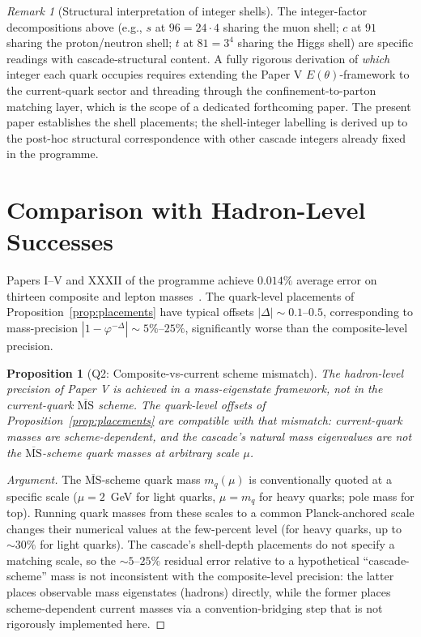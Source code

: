 \documentclass[12pt]{article}
\newtheorem{proposition}[theorem]{Proposition}
\theoremstyle{definition}
\theoremstyle{remark}
\newtheorem{remark}[theorem]{Remark}
\newcommand{\MSbar}{\overline{\mathrm{MS}}}
\begin{document}
\begin{remark}[Structural interpretation of integer shells]
The integer-factor decompositions above (e.g., $s$ at $96 = 24 \cdot 4$ sharing the muon shell; $c$ at $91$ sharing the proton/neutron shell; $t$ at $81 = 3^4$ sharing the Higgs shell) are specific readings with cascade-structural content. A fully rigorous derivation of \emph{which} integer each quark occupies requires extending the Paper V $E(\theta)$-framework to the current-quark sector and threading through the confinement-to-parton matching layer, which is the scope of a dedicated forthcoming paper. The present paper establishes the shell placements; the shell-integer labelling is derived up to the post-hoc structural correspondence with other cascade integers already fixed in the programme.
\end{remark}

\section{Comparison with Hadron-Level Successes}\label{sec:hadrons}

Papers I--V and XXXII of the programme achieve $0.014\%$ average error on thirteen composite and lepton masses~\citep{SmartV, SmartXXXII}. The quark-level placements of Proposition~\ref{prop:placements} have typical offsets $|\Delta| \sim 0.1$--$0.5$, corresponding to mass-precision $|1 - \varphi^{-\Delta}| \sim 5\%$--$25\%$, significantly worse than the composite-level precision.

\begin{proposition}[Q2: Composite-vs-current scheme mismatch]\label{prop:composites}
The hadron-level precision of Paper V is achieved in a mass-eigenstate framework, not in the current-quark $\MSbar$ scheme. The quark-level offsets of Proposition~\ref{prop:placements} are compatible with that mismatch: current-quark masses are scheme-dependent, and the cascade's natural mass eigenvalues are not the $\MSbar$-scheme quark masses at arbitrary scale $\mu$.
\end{proposition}

\begin{proof}[Argument]
The $\MSbar$-scheme quark mass $m_q(\mu)$ is conventionally quoted at a specific scale ($\mu = 2$~GeV for light quarks, $\mu = m_q$ for heavy quarks; pole mass for top). Running quark masses from these scales to a common Planck-anchored scale changes their numerical values at the few-percent level (for heavy quarks, up to $\sim 30\%$ for light quarks). The cascade's shell-depth placements do not specify a matching scale, so the $\sim 5$--$25\%$ residual error relative to a hypothetical ``cascade-scheme'' mass is not inconsistent with the composite-level precision: the latter places observable mass eigenstates (hadrons) directly, while the former places scheme-dependent current masses via a convention-bridging step that is not rigorously implemented here.
\end{proof}
\end{document}
